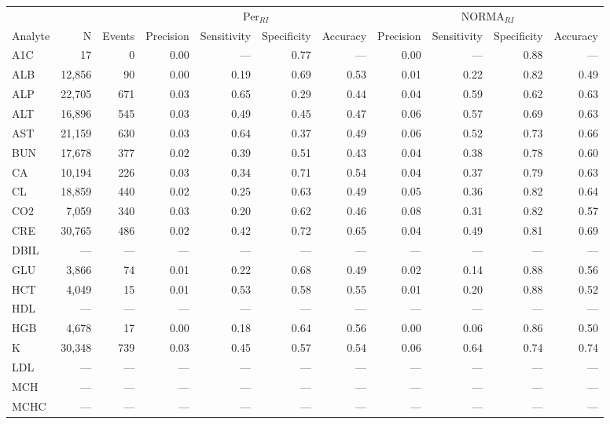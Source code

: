 \begin{table}[ht]
\centering
\footnotesize
\begin{tabular}{lrrrrrrrrrr}
\toprule
 & &  & \multicolumn{4}{c}{Per$_{RI}$} & \multicolumn{4}{c}{NORMA$_{RI}$} \\
\cmidrule(lr){4-7} \cmidrule(lr){8-11}
Analyte & N & Events & Precision & Sensitivity & Specificity & Accuracy & Precision & Sensitivity & Specificity & Accuracy \\
\midrule
A1C & 17 & 0 & 0.00 & --- & 0.77 & --- & 0.00 & --- & 0.88 & --- \\
ALB & 12,856 & 90 & 0.00 & 0.19 & 0.69 & 0.53 & 0.01 & 0.22 & 0.82 & 0.49 \\
ALP & 22,705 & 671 & 0.03 & 0.65 & 0.29 & 0.44 & 0.04 & 0.59 & 0.62 & 0.63 \\
ALT & 16,896 & 545 & 0.03 & 0.49 & 0.45 & 0.47 & 0.06 & 0.57 & 0.69 & 0.63 \\
AST & 21,159 & 630 & 0.03 & 0.64 & 0.37 & 0.49 & 0.06 & 0.52 & 0.73 & 0.66 \\
BUN & 17,678 & 377 & 0.02 & 0.39 & 0.51 & 0.43 & 0.04 & 0.38 & 0.78 & 0.60 \\
CA & 10,194 & 226 & 0.03 & 0.34 & 0.71 & 0.54 & 0.04 & 0.37 & 0.79 & 0.63 \\
CL & 18,859 & 440 & 0.02 & 0.25 & 0.63 & 0.49 & 0.05 & 0.36 & 0.82 & 0.64 \\
CO2 & 7,059 & 340 & 0.03 & 0.20 & 0.62 & 0.46 & 0.08 & 0.31 & 0.82 & 0.57 \\
CRE & 30,765 & 486 & 0.02 & 0.42 & 0.72 & 0.65 & 0.04 & 0.49 & 0.81 & 0.69 \\
DBIL & --- & --- & --- & --- & --- & --- & --- & --- & --- & --- \\
GLU & 3,866 & 74 & 0.01 & 0.22 & 0.68 & 0.49 & 0.02 & 0.14 & 0.88 & 0.56 \\
HCT & 4,049 & 15 & 0.01 & 0.53 & 0.58 & 0.55 & 0.01 & 0.20 & 0.88 & 0.52 \\
HDL & --- & --- & --- & --- & --- & --- & --- & --- & --- & --- \\
HGB & 4,678 & 17 & 0.00 & 0.18 & 0.64 & 0.56 & 0.00 & 0.06 & 0.86 & 0.50 \\
K & 30,348 & 739 & 0.03 & 0.45 & 0.57 & 0.54 & 0.06 & 0.64 & 0.74 & 0.74 \\
LDL & --- & --- & --- & --- & --- & --- & --- & --- & --- & --- \\
MCH & --- & --- & --- & --- & --- & --- & --- & --- & --- & --- \\
MCHC & --- & --- & --- & --- & --- & --- & --- & --- & --- & --- \\

\end{tabular}
\end{table}

